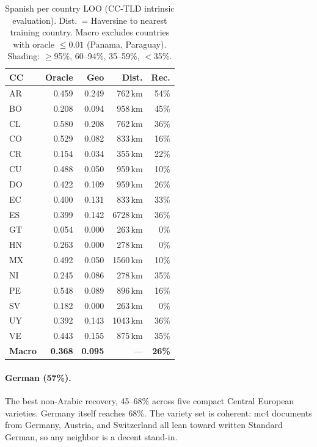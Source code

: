\documentclass[11pt]{article}
\begin{document}
\begin{table}[t]
\centering
\small
\setlength{\tabcolsep}{4.5pt}
\begin{tabular}{lrrrr}
\toprule
\textbf{CC} & \textbf{Oracle} & \textbf{Geo} & \textbf{Dist.} & \textbf{Rec.}\\
\midrule
\rowcolor{mid} AR & 0.459 & 0.249 &  762\,km & 54\% \\
\rowcolor{mid} BO & 0.208 & 0.094 &  958\,km & 45\% \\
\rowcolor{mid} CL & 0.580 & 0.208 &  762\,km & 36\% \\
\rowcolor{low} CO & 0.529 & 0.082 &  833\,km & 16\% \\
\rowcolor{low} CR & 0.154 & 0.034 &  355\,km & 22\% \\
\rowcolor{low} CU & 0.488 & 0.050 &  959\,km & 10\% \\
\rowcolor{low} DO & 0.422 & 0.109 &  959\,km & 26\% \\
\rowcolor{low} EC & 0.400 & 0.131 &  833\,km & 33\% \\
\rowcolor{mid} ES & 0.399 & 0.142 & 6728\,km & 36\% \\
\rowcolor{low} GT & 0.054 & 0.000 &  263\,km &  0\% \\
\rowcolor{low} HN & 0.263 & 0.000 &  278\,km &  0\% \\
\rowcolor{low} MX & 0.492 & 0.050 & 1560\,km & 10\% \\
\rowcolor{mid} NI & 0.245 & 0.086 &  278\,km & 35\% \\
\rowcolor{low} PE & 0.548 & 0.089 &  896\,km & 16\% \\
\rowcolor{low} SV & 0.182 & 0.000 &  263\,km &  0\% \\
\rowcolor{mid} UY & 0.392 & 0.143 & 1043\,km & 36\% \\
\rowcolor{mid} VE & 0.443 & 0.155 &  875\,km & 35\% \\
\midrule
\textbf{Macro} & \textbf{0.368} & \textbf{0.095} & --- & \textbf{26\%}\\
\bottomrule
\end{tabular}
\caption{Spanish per country LOO (CC-TLD intrinsic evaluation).
  Dist.\ = Haversine to nearest training country.
  Macro excludes countries with oracle ${\leq}0.01$ (Panama, Paraguay).
  Shading: \colorbox{best}{$\geq$95\%}, \colorbox{high}{60--94\%}, \colorbox{mid}{35--59\%}, \colorbox{low}{$<$35\%}.}
\label{tab:es}
\end{table}

\paragraph{German (57\%).}
The best non-Arabic recovery, 45--68\% across five compact Central European varieties.
Germany itself reaches 68\%.
The variety set is coherent: mc4 documents from Germany, Austria, and Switzerland all lean toward written Standard German, so any neighbor is a decent stand-in.
\end{document}
